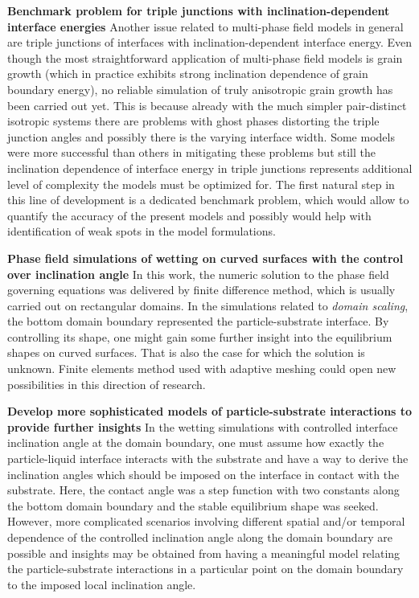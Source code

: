 \textbf{Benchmark problem for triple junctions with inclination-dependent interface energies} Another issue related to multi-phase field models in general are triple junctions of interfaces with inclination-dependent interface energy. Even though the most straightforward application of multi-phase field models is grain growth (which in practice exhibits strong inclination dependence of grain boundary energy), no reliable simulation of truly anisotropic grain growth has been carried out yet. This is because already with the much simpler pair-distinct isotropic systems there are problems with ghost phases distorting the triple junction angles and possibly there is the varying interface width. Some models were more successful than others in mitigating these problems but still the inclination dependence of interface energy in triple junctions represents additional level of complexity the models must be optimized for. The first natural step in this line of development is a dedicated benchmark problem, which would allow to quantify the accuracy of the present models and possibly would help with identification of weak spots in the model formulations. 

\textbf{Phase field simulations of wetting on curved surfaces with the control over inclination angle} In this work, the numeric solution to the phase field governing equations was delivered by finite difference method, which is usually carried out on rectangular domains. In the simulations related to \textit{domain scaling}, the bottom domain boundary represented the particle-substrate interface. By controlling its shape, one might gain some further insight into the equilibrium shapes on curved surfaces. That is also the case for which the solution is unknown. Finite elements method used with adaptive meshing could open new possibilities in this direction of research.
	
\textbf{Develop more sophisticated models of particle-substrate interactions to provide further insights} In the wetting simulations with controlled interface inclination angle at the domain boundary, one must assume how exactly the particle-liquid interface interacts with the substrate and have a way to derive the inclination angles which should be imposed on the interface in contact with the substrate. Here, the contact angle was a step function with two constants along the bottom domain boundary and the stable equilibrium shape was seeked. However, more complicated scenarios involving different spatial and/or temporal dependence of the controlled inclination angle along the domain boundary are possible and insights may be obtained from having a meaningful model relating the particle-substrate interactions in a particular point on the domain boundary to the imposed local inclination angle.
	
